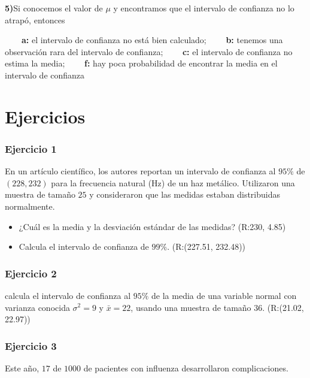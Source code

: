 \documentclass[
]{book}
\begin{document}
\textbf{5)}Si conocemos el valor de \(\mu\) y encontramos que el intervalo de confianza no lo atrapó, entonces

\textbf{\(\qquad\)a:} el intervalo de confianza no está bien calculado;
\textbf{\(\qquad\)b:} tenemos una observación rara del intervalo de confianza;
\textbf{\(\qquad\)c:} el intervalo de confianza no estima la media;
\textbf{\(\qquad\)f:} hay poca probabilidad de encontrar la media en el intervalo de confianza

\hypertarget{ejercicios-11}{%
\section{Ejercicios}\label{ejercicios-11}}

\hypertarget{ejercicio-1-11}{%
\subsubsection{Ejercicio 1}\label{ejercicio-1-11}}

En un artículo científico, los autores reportan un intervalo de confianza al \(95\%\) de \((228, 232)\) para la frecuencia natural (Hz) de un haz metálico. Utilizaron una muestra de tamaño \(25\) y consideraron que las medidas estaban distribuidas normalmente.

\begin{itemize}
\item
  ¿Cuál es la media y la desviación estándar de las medidas? (R:230, 4.85)
\item
  Calcula el intervalo de confianza de \(99\%\). (R:(227.51, 232.48))
\end{itemize}

\hypertarget{ejercicio-2-11}{%
\subsubsection{Ejercicio 2}\label{ejercicio-2-11}}

calcula el intervalo de confianza al \(95\%\) de la media de una variable normal con varianza conocida \(\sigma^2=9\) y \(\bar{x}=22\), usando una muestra de tamaño \(36\). (R:(21.02, 22.97))

\hypertarget{ejercicio-3-8}{%
\subsubsection{Ejercicio 3}\label{ejercicio-3-8}}

Este año, \(17\) de \(1000\) de pacientes con influenza desarrollaron complicaciones.
\end{document}
